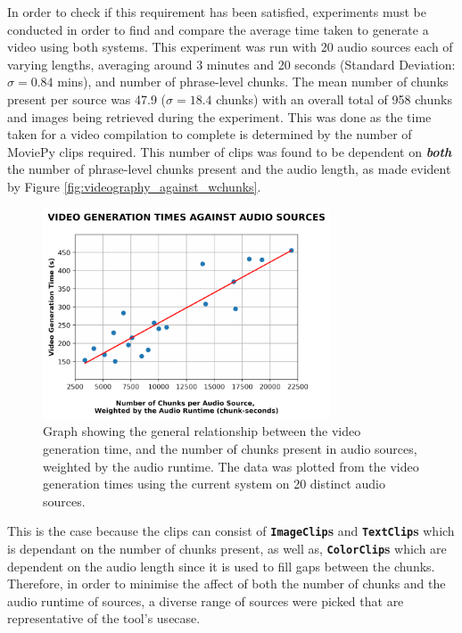 \documentclass{l4proj}
\begin{document}
In order to check if this requirement has been satisfied, experiments must be conducted in order to find and compare the average time taken to generate a video using both systems. This experiment was run with 20 audio sources each of varying lengths, averaging around 3 minutes and 20 seconds (Standard Deviation: $\sigma = 0.84$ mins), and number of phrase-level chunks. The mean number of chunks present per source was 47.9 ($\sigma = 18.4$ chunks) with an overall total of 958 chunks and images being retrieved during the experiment. This was done as the time taken for a video compilation to complete is determined by the number of MoviePy clips required. This number of clips was found to be dependent on \textbf{\emph{both}} the number of phrase-level chunks present and the audio length, as made evident by Figure \ref{fig:videography_against_wchunks}.

\begin{figure}[H]
    \centering
    \includegraphics[width=0.76\textwidth]{figures/video_generation_against_wchunks.pdf}
    \caption{Graph showing the general relationship between the video generation time, and the number of chunks present in audio sources, weighted by the audio runtime. The data was plotted from the video generation times using the current system on 20 distinct audio sources.}
    \label{fig:videograph_agaist_wchunks}
\end{figure}

This is the case because the clips can consist of \textbf{\lstinline|ImageClip|s} and \textbf{\lstinline|TextClip|s} which is dependant on the number of chunks present, as well as, \textbf{\lstinline|ColorClip|s} which are dependent on the audio length since it is used to fill gaps between the chunks. Therefore, in order to minimise the affect of both the number of chunks and the audio runtime of sources, a diverse range of sources were picked that are representative of the tool's usecase. 
\end{document}
